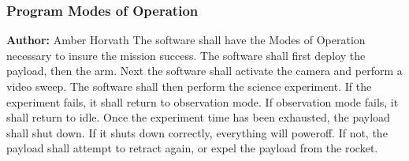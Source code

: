 \subsubsection{Program Modes of Operation}
\textbf{Author:} Amber Horvath
The software shall have the Modes of Operation necessary to insure the mission success.
The software shall first deploy the payload, then the arm. Next the software shall activate the 
camera and perform a video sweep. The software shall then perform the science experiment.
If the experiment fails, it shall return to observation mode.
If observation mode fails, it shall return to idle.
Once the experiment time has been exhausted, the payload shall shut down.
If it shuts down correctly, everything will poweroff. If not, the payload shall attempt to retract 
again, or expel the payload from the rocket.

